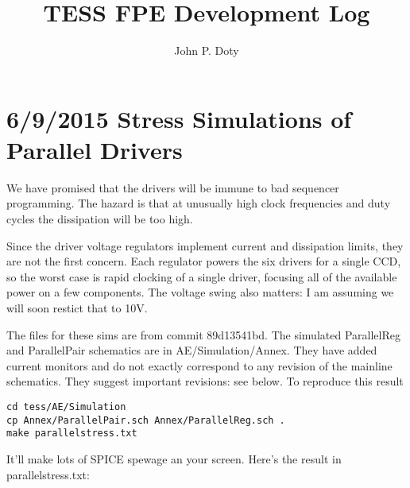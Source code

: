 \documentclass[12pt]{report}
\title{TESS FPE Development Log}
\author{John P. Doty}
\begin{document}
\maketitle

\section*{6/9/2015 Stress Simulations of Parallel Drivers}
We have promised that the drivers will be immune to bad sequencer programming. The hazard is that at unusually high clock frequencies and duty cycles the dissipation will be too high.

Since the driver voltage regulators implement current and dissipation limits, they are not the first concern. Each regulator powers the six drivers for a single CCD, so the worst case is rapid clocking of a single driver, focusing all of the available power on a few components. The voltage swing also matters: I am assuming we will soon restict that to 10V.

The files for these sims are from commit 89d13541bd. The simulated ParallelReg and ParallelPair schematics are in AE/Simulation/Annex. They have added current monitors and do not exactly correspond to any revision of the mainline schematics. They suggest important revisions: see below. To reproduce this result

\begin{verbatim}
cd tess/AE/Simulation
cp Annex/ParallelPair.sch Annex/ParallelReg.sch .
make parallelstress.txt
\end{verbatim}

It'll make lots of SPICE spewage an your screen. Here's the result in parallelstress.txt:
\end{document}
